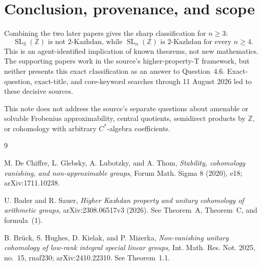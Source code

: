 \documentclass[11pt]{article}
\newcommand{\SL}{\operatorname{SL}}
\newcommand{\Z}{\mathbb Z}
\begin{document}
\section*{Conclusion, provenance, and scope}
Combining the two later papers gives the sharp classification for \(n\ge3\):
\[
 \boxed{\ \SL_3(\Z)\text{ is not 2-Kazhdan, while }
 \SL_n(\Z)\text{ is 2-Kazhdan for every }n\ge4.\ }
\]
This is an agent-identified implication of known theorems, not new
mathematics. The supporting papers work in the source's higher-property-T
framework, but neither presents this exact classification as an answer to
Question~4.6. Exact-question, exact-title, and core-keyword searches through
11 August 2026 led to these decisive sources.

This note does not address the source's separate questions about amenable or
solvable Frobenius approximability, central quotients, semidirect products by
\(\Z\), or cohomology with arbitrary \(C^*\)-algebra coefficients.

\begin{thebibliography}{9}
\raggedright
{}
M. De Chiffre, L. Glebsky, A. Lubotzky, and A. Thom,
\emph{Stability, cohomology vanishing, and non-approximable groups},
Forum Math. Sigma 8 (2020), e18; arXiv:1711.10238.

U. Bader and R. Sauer,
\emph{Higher Kazhdan property and unitary cohomology of arithmetic groups},
arXiv:2308.06517v3 (2026). See Theorem~A, Theorem~C, and formula~(1).

B. Br\"uck, S. Hughes, D. Kielak, and P. Mizerka,
\emph{Non-vanishing unitary cohomology of low-rank integral special linear
groups}, Int. Math. Res. Not. 2025, no.~15, rnaf230;
arXiv:2410.22310. See Theorem~1.1.
\end{thebibliography}
\end{document}

